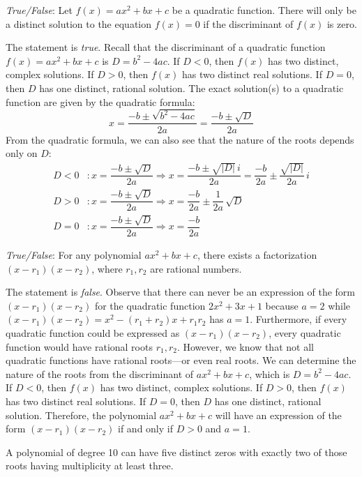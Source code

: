 \documentclass[11pt,letterpaper]{article}
\begin{document}
\quizsol \textit{True/False}: Let $f(x)= ax^2 + bx + c$ be a quadratic function. There will only be a distinct solution to the equation $f(x)= 0$ if the discriminant of $f(x)$ is zero. \pspace

\sol The statement is \textit{true}. Recall that the discriminant of a quadratic function $f(x)= ax^2 + bx + c$ is $D= b^2 - 4ac$. If $D < 0$, then $f(x)$ has two distinct, complex solutions. If $D > 0$, then $f(x)$ has two distinct real solutions. If $D= 0$, then $D$ has one distinct, rational solution. The exact solution(s) to a quadratic function are given by the quadratic formula:
	\[
	x= \dfrac{-b \pm \sqrt{b^2 - 4ac}}{2a}= \dfrac{-b \pm \sqrt{D}}{2a}
	\]
From the quadratic formula, we can also see that the nature of the roots depends only on $D$:
	\[
	\begin{aligned}
	D < 0&\colon x= \dfrac{-b \pm \sqrt{D}}{2a} \Longrightarrow x= \dfrac{-b \pm \sqrt{|D|} \, i}{2a}= \dfrac{-b}{2a} \pm \dfrac{\sqrt{|D|}}{2a} \, i \\[0.3cm]
	D > 0&\colon x= \dfrac{-b \pm \sqrt{D}}{2a} \Longrightarrow x= \dfrac{-b}{2a} \pm \dfrac{1}{2a} \, \sqrt{D} \\[0.3cm]
	D= 0&\colon x= \dfrac{-b \pm \sqrt{D}}{2a} \Longrightarrow x= \dfrac{-b}{2a}
	\end{aligned}
	\] \pvspace{1.3cm}



\quizsol \textit{True/False}: For any polynomial $ax^2 + bx + c$, there exists a factorization $(x - r_1)(x - r_2)$, where $r_1, r_2$ are rational numbers. \pspace

\sol The statement is \textit{false}. Observe that there can never be an expression of the form $(x - r_1)(x - r_2)$ for the quadratic function $2x^2 + 3x + 1$ because $a= 2$ while $(x - r_1)(x - r_2)= x^2 - (r_1 + r_2)x + r_1r_2$ has $a= 1$. Furthermore, if every quadratic function could be expressed as $(x - r_1)(x - r_2)$, every quadratic function would have rational roots $r_1, r_2$. However, we know that not all quadratic functions have rational roots---or even real roots. We can determine the nature of the roots from the discriminant of $ax^2 + bx + c$, which is $D= b^2 - 4ac$. If $D < 0$, then $f(x)$ has two distinct, complex solutions. If $D > 0$, then $f(x)$ has two distinct real solutions. If $D= 0$, then $D$ has one distinct, rational solution. Therefore, the polynomial $ax^2 + bx + c$ will have an expression of the form $(x - r_1)(x - r_2)$ if and only if $D > 0$ and $a= 1$. 






A polynomial of degree 10 can have five distinct zeros with exactly two of those roots having multiplicity at least three.
\end{document}
